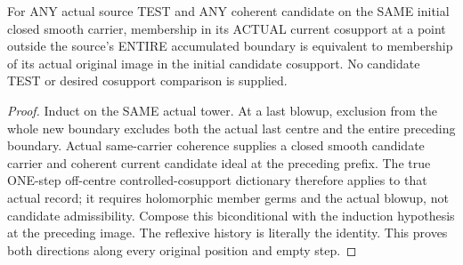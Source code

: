 \begin{lemma}
\label{hir:original-same-carrier-cosupport-off-boundary}
\leanok
For ANY actual source TEST and ANY coherent candidate on the SAME initial
closed smooth carrier, membership in its ACTUAL current cosupport at a
point outside the source's ENTIRE accumulated boundary is equivalent to
membership of its actual original image in the initial candidate
cosupport. No candidate TEST or desired cosupport comparison is supplied.
\end{lemma}
\begin{proof}
Induct on the SAME actual tower. At a last blowup, exclusion from the
whole new boundary excludes both the actual last centre and the entire
preceding boundary. Actual same-carrier coherence supplies a closed smooth
candidate carrier and coherent current candidate ideal at the preceding
prefix. The true ONE-step off-centre controlled-cosupport dictionary
therefore applies to that actual record; it requires holomorphic member
germs and the actual blowup, not candidate admissibility. Compose this
biconditional with the induction hypothesis at the preceding image. The
reflexive history is literally the identity. This proves both directions
along every original position and empty step.
\end{proof}

